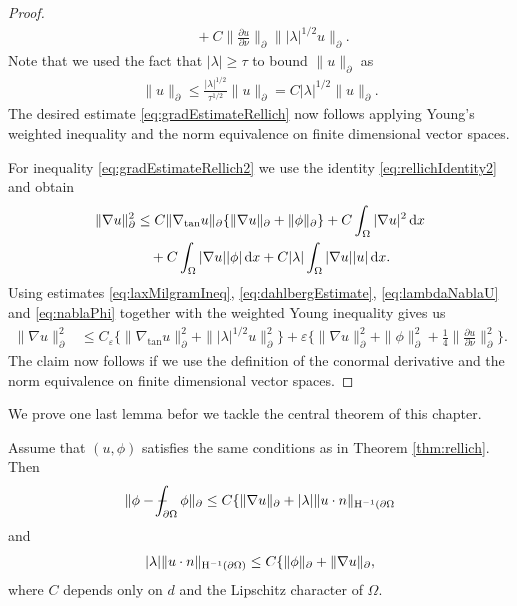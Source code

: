 \begin{proof}
\begin{align*}
    &\quad+ C \| \frac{\partial u}{\partial \nu} \|_\partial \| |\lambda|^{1/2} u\|_\partial.
  \end{align*}
  Note that we used the fact that $|\lambda| \geq \tau$ to bound $\|u\|_\partial$ as
  \begin{align*}
    \|u\|_\partial \leq \frac{|\lambda|^{1/2}}{\tau^{1/2}} \|u\|_\partial = C |\lambda|^{1/2} \|u\|_{\partial}.
  \end{align*}
  The desired estimate \eqref{eq:gradEstimateRellich} now follows applying Young's weighted inequality and the norm equivalence on finite dimensional vector spaces.

  For inequality \eqref{eq:gradEstimateRellich2} we use the identity \eqref{eq:rellichIdentity2} and obtain
  \begin{align*}
    \| \nabla u\|_\partial^2 
    &\leq C \|\nabla_{\mathrm{tan}} u\|_\partial \{ \|\nabla u\|_\partial + \|\phi\|_\partial \} + C \int_\Omega |\nabla u|^2 \, {\operatorname{d}\!{x}} \\
    &\quad+ C \int_\Omega |\nabla u| |\phi| \, {\operatorname{d}\!{x}} + C |\lambda| \int_\Omega |\nabla u| |u|\, {\operatorname{d}\!{x}}.
  \end{align*}
  Using estimates \eqref{eq:laxMilgramIneq}, \eqref{eq:dahlbergEstimate}, \eqref{eq:lambdaNablaU} and \eqref{eq:nablaPhi} together with the weighted Young inequality gives us
  \begin{align*}
    \|\nabla u\|_\partial^2 
    &\leq C_\varepsilon \{ \|\nabla_{\mathrm{tan}} u\|_\partial^2 + \| |\lambda|^{1/2} u\|_\partial^2 \}  + \varepsilon \{ \|\nabla u\|_\partial^2 + \|\phi\|_\partial^2 + \frac{1}{4}\|\frac{\partial u}{\partial \nu} \|_\partial^2 \}.
  \end{align*}
  The claim now follows if we use the definition of the conormal derivative and the norm equivalence on finite dimensional vector spaces.
\end{proof}

We prove one last lemma befor we tackle the central theorem of this chapter.

\begin{lem}
  Assume that $(u,\phi)$ satisfies the same conditions as in Theorem \ref{thm:rellich}.
  Then
  \begin{align}
    \label{eq:phiDashintPhi}
    \| \phi - \dashint_{\partial\Omega} \phi \|_\partial \leq C \{ \|\nabla u\|_\partial + |\lambda| \|u\cdot n\|_{\HH^{-1}(\partial\Omega}
  \end{align}
  and
  \begin{align}
    \label{eq:lambdaun}
    |\lambda| \| u\cdot n \|_{\mathrm{H}^{-1}(\partial\Omega)} \leq C \{ \|\phi\|_\partial + \|\nabla u\|_\partial,
  \end{align}
  where $C$ depends only on $d$ and the Lipschitz character of $\Omega$.
\end{lem}

